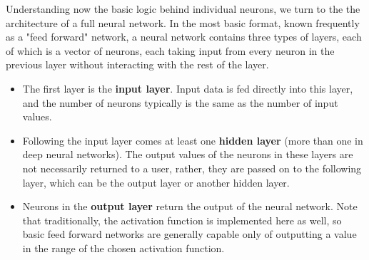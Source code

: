 \documentclass{article}
\begin{document}
Understanding now the basic logic behind individual neurons, we turn to the the architecture of a full neural network. In the most basic format, known frequently as a "feed forward" network, a neural network contains three types of layers, each of which is a vector of neurons, each taking input from every neuron in the previous layer without interacting with the rest of the layer.
\begin{itemize}
\item{The first layer is the \textbf{input layer}. Input data is fed directly into this layer, and the number of neurons typically is the same as the number of input values.}
\item{Following the input layer comes at least one \textbf{hidden layer} (more than one in deep neural networks). The output values of the neurons in these layers are not necessarily returned to a user, rather, they are passed on to the following layer, which can be the output layer or another hidden layer.}
\item{Neurons in the \textbf{output layer} return the output of the neural network. Note that traditionally, the activation function is implemented here as well, so basic feed forward networks are generally capable only of outputting a value in the range of the chosen activation function.}
\end{itemize}

\begin{center}
\end{center}
\end{document}
